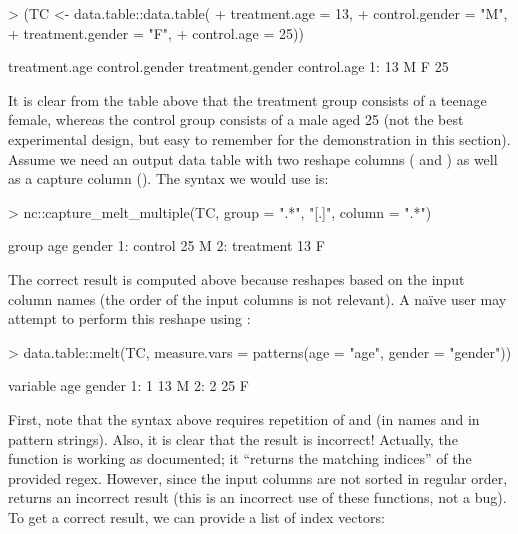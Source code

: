 \begin{Schunk}
\begin{Sinput}
> (TC <- data.table::data.table(
+   treatment.age = 13,
+   control.gender = "M",
+   treatment.gender = "F",
+   control.age = 25))
\end{Sinput}
\begin{Soutput}
   treatment.age control.gender treatment.gender control.age
1:            13              M                F          25
\end{Soutput}
\end{Schunk}

It is clear from the table above that the treatment group consists of
a teenage female, whereas the control group consists of a male aged 25
(not the best experimental design, but easy to remember for the
demonstration in this section). Assume we need an output data table
with two reshape columns ( and ) as well as a
capture column (). The  syntax we would use is:

\begin{Schunk}
\begin{Sinput}
> nc::capture_melt_multiple(TC, group = ".*", "[.]", column = ".*")
\end{Sinput}
\begin{Soutput}
       group age gender
1:   control  25      M
2: treatment  13      F
\end{Soutput}
\end{Schunk}

The correct result is computed above because  reshapes based
on the input column names (the order of the input columns is not
relevant). A na\"ive user may attempt to perform this reshape using
:

\begin{Schunk}
\begin{Sinput}
> data.table::melt(TC, measure.vars = patterns(age = "age", gender = "gender"))
\end{Sinput}
\begin{Soutput}
   variable age gender
1:        1  13      M
2:        2  25      F
\end{Soutput}
\end{Schunk}

First, note that the syntax above requires repetition of 
and  (in names and in pattern strings). Also, it is clear
that the result is incorrect!  Actually, the  function
is working as documented; it ``returns the matching indices'' of the
provided regex. However, since the input columns are not sorted in
regular order,  returns an incorrect result (this is an
incorrect use of these functions, not a bug). To get a
correct result, we can provide a list of index vectors:

